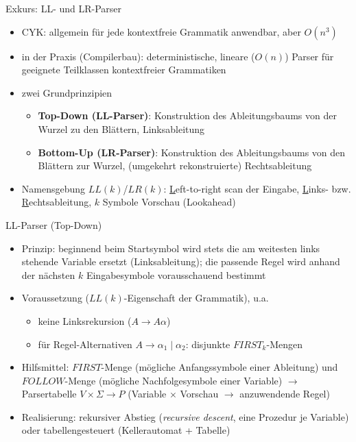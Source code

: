 \begin{frame}{Exkurs: LL- und LR-Parser}
	\begin{itemize}
		\item CYK: allgemein für jede kontextfreie Grammatik anwendbar, aber $O(n^3)$
		\item in der Praxis (Compilerbau): deterministische, lineare ($O(n)$) Parser für geeignete Teilklassen kontextfreier Grammatiken
		\item zwei Grundprinzipien
		\begin{itemize}
			\item \textbf{Top-Down (LL-Parser)}: Konstruktion des Ableitungsbaums von der Wurzel zu den Blättern, Linksableitung
			\item \textbf{Bottom-Up (LR-Parser)}: Konstruktion des Ableitungsbaums von den Blättern zur Wurzel, (umgekehrt rekonstruierte) Rechtsableitung
		\end{itemize}
		\item Namensgebung $LL(k)$/$LR(k)$: \underline{L}eft-to-right scan der Eingabe, \underline{L}inks- bzw. \underline{R}echtsableitung, $k$ Symbole Vorschau (Lookahead)
	\end{itemize}
\end{frame}

\begin{frame}{LL-Parser (Top-Down)}
	\begin{itemize}
		\item Prinzip: beginnend beim Startsymbol wird stets die am weitesten links stehende Variable ersetzt (Linksableitung); die passende Regel wird anhand der nächsten $k$ Eingabesymbole vorausschauend bestimmt
		\item Voraussetzung ($LL(k)$-Eigenschaft der Grammatik), u.a.
		\begin{itemize}
			\item keine Linksrekursion ($A \rightarrow A\alpha$)
			\item für Regel-Alternativen $A \rightarrow \alpha_1 \mid \alpha_2$: disjunkte $FIRST_k$-Mengen
		\end{itemize}
		\item Hilfsmittel: $FIRST$-Menge (mögliche Anfangssymbole einer Ableitung) und $FOLLOW$-Menge (mögliche Nachfolgesymbole einer Variable) $\rightarrow$ Parsertabelle $V \times \Sigma \rightarrow P$ (Variable $\times$ Vorschau $\rightarrow$ anzuwendende Regel)
		\item Realisierung: rekursiver Abstieg (\emph{recursive descent}, eine Prozedur je Variable) oder tabellengesteuert (Kellerautomat + Tabelle)
	\end{itemize}
\end{frame}

